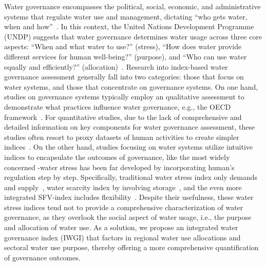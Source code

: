 \documentclass[draft]{../agujournal2019}
\begin{document}
Water governance encompasses the political, social, economic, and administrative systems that regulate water use and management, dictating ``who gets water, when and how''~\cite{lasswell2018,allan2001}.
In this context, the United Nations Development Programme (UNDP) suggests that water governance determines water usage across three core aspects: ``When and what water to use?'' (stress), ``How does water provide different services for human well-being?'' (purpose), and ``Who can use water equally and efficiently?'' (allocation)~\cite{mariajacobson2013}.
Research into index-based water governance assessment generally fall into two categories: those that focus on water systems, and those that concentrate on governance systems.
On one hand, studies on governance systems typically employ an qualitative assessment to demonstrate what practices influence water governance, e.g., the OECD framework~\cite{oecd2018a}.
For quantitative studies, due to the lack of comprehensive and detailed information on key components for water governance assessment, these studies often resort to proxy datasets of human activities to create simpler indices~\cite{varis2019,huggins2020}.
On the other hand, studies focusing on water systems utilize intuitive indices to encapsulate the outcomes of governance, like the most widely concerned -water stress has been far developed by incorporating human's regulation step by step.
Specifically, traditional water stress index only demands and supply~\cite{gleick1996}, water scarcity index by involving storage~\cite{damkjaer2017}, and the even more integrated SFV-index includes flexibility~\cite{qin2019}.
Despite their usefulness, these water stress indices tend not to provide a comprehensive characterization of water governance, as they overlook the social aspect of water usage, i.e., the purpose and allocation of water use.
As a solution, we propose an integrated water governance index (IWGI) that factors in regional water use allocations and sectoral water use purpose, thereby offering a more comprehensive quantification of governance outcomes.
\end{document}
